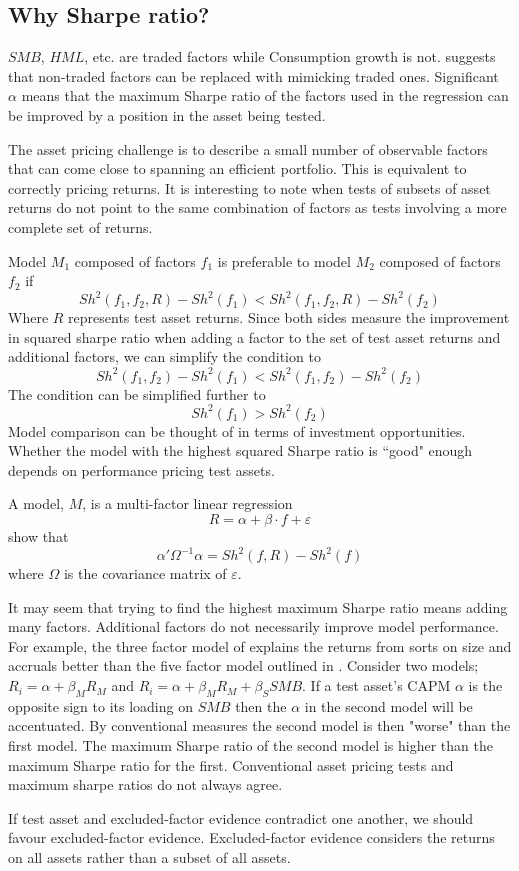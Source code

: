 
\subsection{Why Sharpe ratio? \textcite{barillas2016alpha}}

$SMB$, $HML$, etc. are traded factors while Consumption growth is not.
\textcite{breeden2005intertemporal} suggests that non-traded factors can be replaced with 
mimicking traded ones.
Significant $\alpha$ means that the maximum Sharpe ratio of the factors used in the regression 
can be improved by a position in the asset being tested.

The asset pricing challenge is to describe a small number of observable factors that can come 
close to spanning an efficient portfolio.
This is equivalent to correctly pricing returns.
It is interesting to note when tests of subsets of asset returns do not point 
to the same combination of factors as tests involving a more complete set of 
returns.

Model $M_1$ composed of factors $f_1$ is preferable to model $M_2$ composed of 
factors $f_2$ if
\[
Sh^2(f_1, f_2, R) - Sh^2(f_1) < Sh^2(f_1, f_2, R) - Sh^2(f_2)
\]
Where $R$ represents test asset returns.
Since both sides measure the improvement in squared sharpe ratio when adding a 
factor to the set of test asset returns and additional factors,
we can simplify the condition to
\[
Sh^2(f_1, f_2) - Sh^2(f_1) < Sh^2(f_1, f_2) - Sh^2(f_2)
\]
The condition can be simplified further to
\[
Sh^2(f_1)>Sh^2(f_2)
\]
Model comparison can be thought of in terms of investment opportunities.
Whether the model with the highest squared Sharpe ratio is ``good" enough depends on 
performance pricing test assets.

A model, $M$, is a multi-factor linear regression
\[
R = \alpha + \beta\cdot f + \varepsilon
\]
\textcite{gibbons1989test} show that
\[
\alpha ' \Omega^{-1}\alpha = Sh^2(f, R) - Sh^2(f)
\]
where $\Omega$ is the covariance matrix of $\varepsilon$.

It may seem that trying to find the highest maximum Sharpe ratio means adding many factors.
Additional factors do not necessarily improve model performance.
For example, the three factor model of \textcite{fama1993common} explains the returns from 
sorts on size and accruals better than the five factor model outlined in 
\textcite{fama2015five}.
Consider two models; $R_i=\alpha+\beta_MR_M$ and $R_i=\alpha+\beta_MR_M+\beta_SSMB$.
If a test asset's CAPM $\alpha$ is the opposite sign to its loading on $SMB$ 
then the $\alpha$ in the second model will be accentuated.
By conventional measures the second model is then "worse" than the first model.
The maximum Sharpe ratio of the second model is higher than the maximum Sharpe 
ratio for the first.
Conventional asset pricing tests and maximum sharpe ratios do not always agree.

If test asset and excluded-factor evidence contradict one another, we should favour 
excluded-factor evidence.
Excluded-factor evidence considers the returns on all assets rather than a subset of all 
assets.
